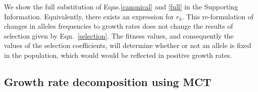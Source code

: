 \documentclass[]{article}
\begin{document}




We show the full substitution of Eqns.\ref{canonical} and \ref{full} in the Supporting Information. Equivalently, there exists an expression for $r_{k}$. This re-formulation of changes in alleles frequencies to growth rates does not change the results of selection given by Eqn.~\ref{selection}. The fitness values, and consequently the values of the selection coefficients, will determine whether or not an allele is fixed in the population, which would would be reflected in positive growth rates.

\subsection*{Growth rate decomposition using MCT}
\end{document}
